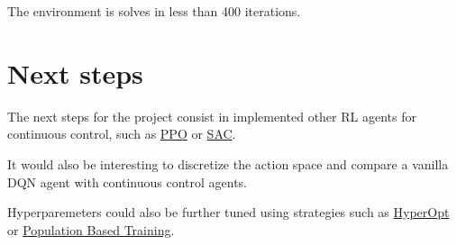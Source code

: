 \documentclass{article}
\begin{document}
    The environment is solves in less than 400 iterations.

    \section{Next steps}\label{sec:next-steps}

    The next steps for the project consist in implemented other RL agents for continuous control, such as
    \href{https://openai.com/blog/openai-baselines-ppo/}{PPO} or \href{https://arxiv.org/abs/1801.01290}{SAC}.

    It would also be interesting to discretize the action space and compare a vanilla DQN agent
    with continuous control agents.

    Hyperparemeters could also be further tuned using strategies such as
    \href{https://github.com/hyperopt/hyperopt}{HyperOpt} or
    \href{https://deepmind.com/blog/article/population-based-training-neural-networks}{Population Based Training}.
\end{document}
